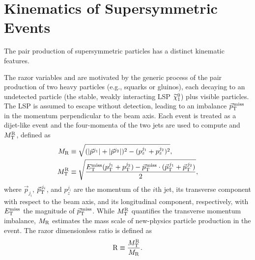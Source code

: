\section{Kinematics of Supersymmetric Events}
\label{sec:kinematic}
The pair production of supersymmetric particles has a distinct
kinematic features.


The razor variables \MR and  \Rtwo are motivated by the generic process of the pair production of two
heavy particles (e.g., squarks or gluinos), each decaying to an
undetected particle (the stable, weakly interacting LSP $\widetilde{\chi}^{0}_1$)
plus visible particles. The LSP is assumed to escape without
detection, leading to an imbalance ${\vec p}_{\mathrm{T}}^{\kern1pt\text{miss}}$ in the momentum
perpendicular to the beam axis. Each event is treated as a dijet-like event
and the four-momenta of the two jets are used to compute \MR and $M_\mathrm{T}^\mathrm{R}$, defined as
\begin{align}
 \label{eq:MRstar}
 M_\mathrm{R} &\equiv
 \sqrt{
(\lvert \vec{p}^{j_{1}} \rvert+\lvert \vec{p}^{j_{2}} \rvert)^2 -({p}^{j_1}_z+{p}^{j_2}_z)^2},\\
M_\mathrm{T}^\mathrm{R} &\equiv \sqrt{ \frac{E_{\mathrm{T}}^{\text{miss}}(p_{\mathrm{T}}^{j_1}+p_{\mathrm{T}}^{j_2}) -
{\vec p}_{\mathrm{T}}^{\kern1pt\text{miss}} \cdot
 ({\vec p}_{\mathrm{T}}^{\,j_1}+{\vec p}_{\mathrm{T}}^{\,j_2}) }{2}},
\end{align}
where $\vec{p}_{j_i}$, ${\vec p}_{\mathrm{T}}^{\,j_i}$, and
$p^{j_i}_z$ are the momentum of the $i$th jet, its
transverse component with respect to the beam axis, and its
longitudinal component, respectively, with $E_{\mathrm{T}}^{\text{miss}}$ the magnitude of ${\vec p}_{\mathrm{T}}^{\kern1pt\text{miss}}$. While
$M_\mathrm{T}^\mathrm{R}$ quantifies the transverse momentum imbalance,
$M_\mathrm{R}$ estimates the mass scale of new-physics particle
production in the event. The razor dimensionless ratio is defined as
\begin{equation}
\mathrm{R} \equiv \frac{M_\mathrm{T}^\mathrm{R}}{M_\mathrm{R}}.
\end{equation}